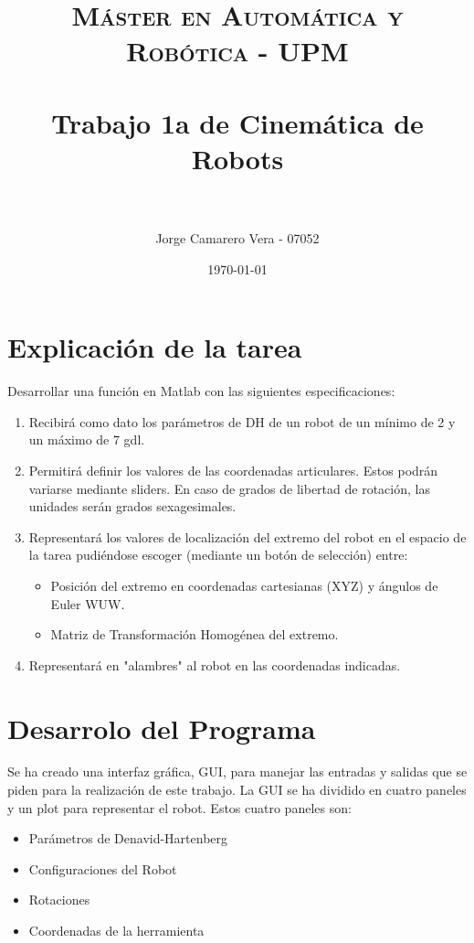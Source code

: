 \documentclass[a4paper, fontsize=11pt]{scrartcl} %
\title{	
	\normalfont \normalsize 
	\textsc{Máster en Automática y Robótica - UPM} \\ [25pt] %
	\horrule{0.5pt} \\[0.4cm] %
	\huge Trabajo 1a de Cinemática de Robots \\ %
	\horrule{2pt} \\[0.5cm] %
}
\author{Jorge Camarero Vera - 07052} %
\date{\normalsize\today} %
\numberwithin{equation}{section} %
\numberwithin{figure}{section} %
\numberwithin{table}{section} %
\begin{document}
	\maketitle
	
	\section{Explicación de la tarea}
	
	Desarrollar una función en Matlab con las siguientes especificaciones:
	
	\begin{enumerate}
		\item Recibirá como dato los parámetros de DH de un robot de un mínimo de 2 y un máximo de 7 gdl.
		\item Permitirá definir los valores de las coordenadas articulares. Estos podrán variarse mediante sliders. En caso de grados de libertad de rotación, las unidades serán grados sexagesimales.
		\item Representará los valores de localización del extremo del robot en el espacio de la tarea pudiéndose escoger (mediante un botón de selección) entre:
		\begin{itemize}
			\item Posición del extremo en coordenadas cartesianas (XYZ) y ángulos de Euler WUW.
			\item Matriz de Transformación Homogénea del extremo.
		\end{itemize}
		\item Representará en "alambres" al robot en las coordenadas indicadas.
	\end{enumerate}
	
	
	\section{Desarrolo del Programa}
	
	Se ha creado una interfaz gráfica, GUI, para manejar las entradas y salidas que se piden para la realización de este trabajo. La GUI se ha dividido en cuatro paneles y un plot para representar el robot. Estos cuatro paneles son:
	
	\begin{itemize}
		\item Parámetros de Denavid-Hartenberg
		\item Configuraciones del Robot
		\item Rotaciones
		\item Coordenadas de la herramienta
	\end{itemize}
	
\end{document}
